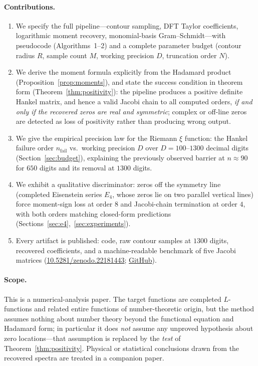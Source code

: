 \documentclass[11pt]{article}
\theoremstyle{definition}
\begin{document}
\paragraph{Contributions.}
\begin{enumerate}
\item We specify the full pipeline---contour sampling, DFT Taylor
coefficients, logarithmic moment recovery, monomial-basis
Gram--Schmidt---with pseudocode (Algorithms~1--2)
and a complete parameter budget (contour radius $R$, sample count
$M$, working precision $D$, truncation order $N$).
\item We derive the moment formula explicitly from the Hadamard
product (Proposition~\ref{prop:moments}), and state the success
condition in theorem form (Theorem~\ref{thm:positivity}): the pipeline
produces a positive definite Hankel matrix, and hence a valid Jacobi
chain to all computed orders, \emph{if and only if the recovered
zeros are real and symmetric}; complex or off-line zeros are
detected as loss of positivity rather than producing wrong output.
\item We give the empirical precision law for the Riemann $\xi$
function: the Hankel failure order $n_{\text{fail}}$ vs.\ working
precision $D$ over $D=100$--$1300$ decimal digits (Section~\ref{sec:budget}),
explaining the previously observed barrier at $n\approx 90$ for
$650$ digits and its removal at $1300$ digits.
\item We exhibit a qualitative discriminator: zeros off the symmetry
line (completed Eisenstein series $E_4$, whose zeros lie on two
parallel vertical lines) force moment-sign loss at order $8$ and
Jacobi-chain termination at order $4$, with both orders matching
closed-form predictions (Sections~\ref{sec:e4},~\ref{sec:experiments}).
\item Every artifact is published: code, raw contour samples at
$1300$ digits, recovered coefficients, and a machine-readable
benchmark of five Jacobi matrices
(\href{https://doi.org/10.5281/zenodo.22181443}{10.5281/zenodo.22181443};
\href{https://github.com/maomao8412/hilbert-polya-jacobi}{GitHub}).
\end{enumerate}

\paragraph{Scope.} This is a numerical-analysis paper. The target
functions are completed $L$-functions and related entire functions
of number-theoretic origin, but the method assumes nothing about
number theory beyond the functional equation and Hadamard form; in
particular it does \emph{not} assume any unproved hypothesis about
zero locations---that assumption is replaced by the \emph{test} of
Theorem~\ref{thm:positivity}. Physical or statistical conclusions
drawn from the recovered spectra are treated in a companion paper.
\end{document}
